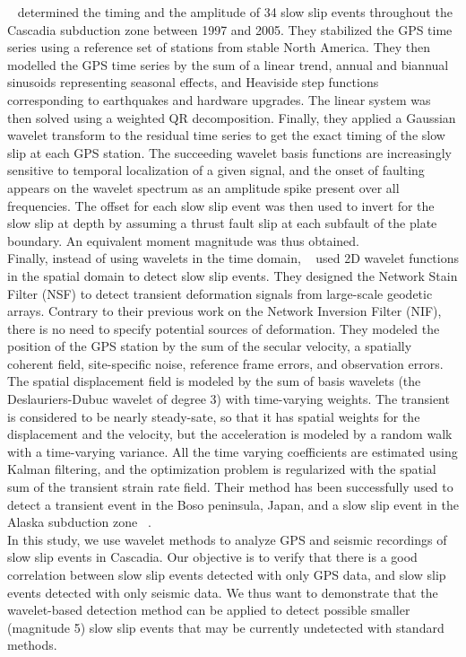 \documentclass[draft]{agujournal2018}
\begin{document}
~\citet{SZE_2008} determined the timing and the amplitude of 34 slow slip events throughout the Cascadia subduction zone between 1997 and 2005. They stabilized the GPS time series using a reference set of stations from stable North America. They then modelled the GPS time series by the sum of a linear trend, annual and biannual sinusoids representing seasonal effects, and Heaviside step functions corresponding to earthquakes and hardware upgrades. The linear system was then solved using a weighted QR decomposition. Finally, they applied a Gaussian wavelet transform to the residual time series to get the exact timing of the slow slip at each GPS station. The succeeding wavelet basis functions are increasingly sensitive to temporal localization of a given signal, and the onset of faulting appears on the wavelet spectrum as an amplitude spike present over all frequencies. The offset for each slow slip event was then used to invert for the slow slip at depth by assuming a thrust fault slip at each subfault of the plate boundary. An equivalent moment magnitude was thus obtained. \\

Finally, instead of using wavelets in the time domain, ~\citet{OHT_2010} used 2D wavelet functions in the spatial domain to detect slow slip events. They designed the Network Stain Filter (NSF) to detect transient deformation signals from large-scale geodetic arrays. Contrary to their previous work on the Network Inversion Filter (NIF), there is no need to specify potential sources of deformation. They modeled the position of the GPS station by the sum of the secular velocity, a spatially coherent field, site-specific noise, reference frame errors, and observation errors. The spatial displacement field is modeled by the sum of basis wavelets (the Deslauriers-Dubuc wavelet of degree 3) with time-varying weights. The transient is considered to be nearly steady-sate, so that it has spatial weights for the displacement and the velocity, but the acceleration is modeled by a random walk with a time-varying variance. All the time varying coefficients are estimated using Kalman filtering, and the optimization problem is regularized with the spatial sum of the transient strain rate field. Their method has been successfully used to detect a transient event in the Boso peninsula, Japan, and a slow slip event in the Alaska subduction zone ~\citep{WEI_2012}. \\

In this study, we use wavelet methods to analyze GPS and seismic recordings of slow slip events in Cascadia. Our objective is to verify that there is a good correlation between slow slip events detected with only GPS data, and slow slip events detected with only seismic data. We thus want to demonstrate that the wavelet-based detection method can be applied to detect possible smaller (magnitude 5) slow slip events that may be currently undetected with standard methods.
\end{document}
